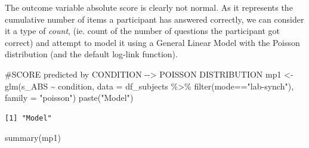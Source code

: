 \documentclass[
  letterpaper,
  DIV=11,
  numbers=noendperiod]{scrreprt}
\newenvironment{Shaded}{\begin{snugshade}}{\end{snugshade}}
\newcommand{\AttributeTok}[1]{\textcolor[rgb]{0.40,0.45,0.13}{#1}}
\newcommand{\CommentTok}[1]{\textcolor[rgb]{0.37,0.37,0.37}{#1}}
\newcommand{\FunctionTok}[1]{\textcolor[rgb]{0.28,0.35,0.67}{#1}}
\newcommand{\NormalTok}[1]{\textcolor[rgb]{0.00,0.23,0.31}{#1}}
\newcommand{\OtherTok}[1]{\textcolor[rgb]{0.00,0.23,0.31}{#1}}
\newcommand{\SpecialCharTok}[1]{\textcolor[rgb]{0.37,0.37,0.37}{#1}}
\newcommand{\StringTok}[1]{\textcolor[rgb]{0.13,0.47,0.30}{#1}}
\begin{document}
The outcome variable absolute score is clearly not normal. As it
represents the cumulative number of items a participant has answered
correctly, we can consider it a type of \emph{count}, (ie. count of the
number of questions the participant got correct) and attempt to model it
using a General Linear Model with the Poisson distribution (and the
default log-link function).

\begin{Shaded}
\end{Shaded}

\begin{Shaded}
\begin{Highlighting}[]
\CommentTok{\#SCORE predicted by CONDITION {-}{-}\textgreater{} POISSON DISTRIBUTION}
\NormalTok{mp1 }\OtherTok{\textless{}{-}} \FunctionTok{glm}\NormalTok{(s\_ABS }\SpecialCharTok{\textasciitilde{}}\NormalTok{ condition, }\AttributeTok{data =}\NormalTok{ df\_subjects }\SpecialCharTok{\%\textgreater{}\%} \FunctionTok{filter}\NormalTok{(mode}\SpecialCharTok{==}\StringTok{"lab{-}synch"}\NormalTok{), }\AttributeTok{family =} \StringTok{"poisson"}\NormalTok{)}
\FunctionTok{paste}\NormalTok{(}\StringTok{"Model"}\NormalTok{)}
\end{Highlighting}
\end{Shaded}

\begin{verbatim}
[1] "Model"
\end{verbatim}

\begin{Shaded}
\begin{Highlighting}[]
\FunctionTok{summary}\NormalTok{(mp1)}
\end{Highlighting}
\end{Shaded}
\end{document}
